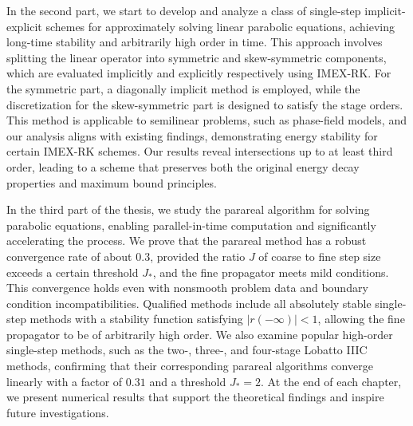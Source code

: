 \documentclass[a4paper, oneside]{book}
\begin{document}
In the second part, we start to develop and analyze a class of single-step implicit-explicit schemes for approximately solving linear parabolic equations, achieving long-time stability and arbitrarily high order in time. This approach involves splitting the linear operator into symmetric and skew-symmetric components, which are evaluated implicitly and explicitly respectively using IMEX-RK. For the symmetric part, a diagonally implicit method is employed, while the discretization for the skew-symmetric part is designed to satisfy the stage orders. This method is applicable to semilinear problems, such as phase-field models, and our analysis aligns with existing findings, demonstrating energy stability for certain IMEX-RK schemes. Our results reveal intersections up to at least third order, leading to a scheme that preserves both the original energy decay properties and maximum bound principles.

In the third part of the thesis, we study the parareal algorithm for solving parabolic equations, enabling parallel-in-time computation and significantly accelerating the process. We prove that the parareal method has a robust convergence rate of about $0.3$, provided the ratio $J$ of coarse to fine step size exceeds a certain threshold $J_*$, and the fine propagator meets mild conditions. This convergence holds even with nonsmooth problem data and boundary condition incompatibilities. Qualified methods include all absolutely stable single-step methods with a stability function satisfying $\lvert r(-\infty) \rvert < 1$, allowing the fine propagator to be of arbitrarily high order. We also examine popular high-order single-step methods, such as the two-, three-, and four-stage Lobatto IIIC methods, confirming that their corresponding parareal algorithms converge linearly with a factor of $0.31$ and a threshold $J_* = 2$. At the end of each chapter, we present numerical results that support the theoretical findings and inspire future investigations.
\end{document}
